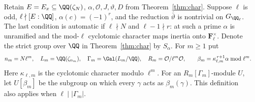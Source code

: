 \documentclass[a4paper,11pt]{article}
\theoremstyle{definition}
\theoremstyle{remark}
\numberwithin{equation}{section}
\newcommand{\OO}{\mathcal O}
\begin{document}
Retain \(E=E_x\subseteq\QQ(\zeta_N)\), \(\alpha,\OO,J,\vartheta,D\) from Theorem~\ref{thm:char}. Suppose \(\ell\) is odd, \(\ell\nmid [E:\QQ]\), \(\alpha(c)=(-1)^r\), and the reduction \(\bar\vartheta\) is nontrivial on \(G_{\QQ_\ell}\). The last condition is automatic if \(\ell\nmid N\) and \(\ell-1\nmid r\): at such a prime \(\alpha\) is unramified and the mod-\(\ell\) cyclotomic character maps inertia onto \(\mathbf F_\ell^\times\). Denote the strict group over \(\QQ\) in Theorem~\ref{thm:char} by \(S_\alpha\). For \(m\ge1\) put
\[
 n_m=N\ell^m,\quad L_m=\QQ(\zeta_{n_m}),\quad
 \Gamma_m=\Gal(L_m/\QQ),\quad R_m=\OO/\ell^m\OO ,
 \qquad \beta_m=\kappa_{\ell,m}^{\,r+1}\alpha\bmod\ell^m .
\]
Here \(\kappa_{\ell,m}\) is the cyclotomic character modulo \(\ell^m\). For an \(R_m[\Gamma_m]\)-module \(U\), let \(U[\beta_m]\) be the subgroup on which every \(\gamma\) acts as \(\beta_m(\gamma)\). This definition also applies when \(\ell\mid |\Gamma_m|\).
\end{document}
